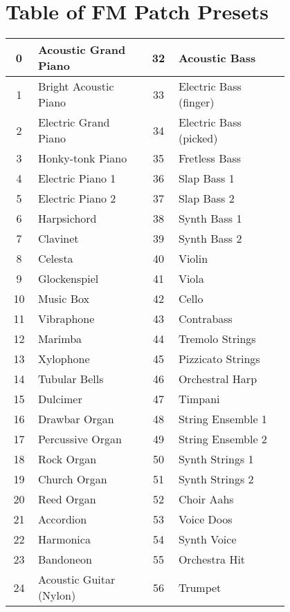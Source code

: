 \chapter{Table of FM Patch Presets}
\begin{tabular}{|c|p{0.4\linewidth}|c|p{0.4\linewidth}|}
	\hline
	0  &  Acoustic Grand Piano  & 32  &  Acoustic Bass  \\ \hline
	1  &  Bright Acoustic Piano  & 33  &  Electric Bass (finger)  \\ \hline
	2  &  Electric Grand Piano  & 34  &  Electric Bass (picked)  \\ \hline
	3  &  Honky-tonk Piano  & 35  &  Fretless Bass  \\ \hline
	4  &  Electric Piano 1  & 36  &  Slap Bass 1  \\ \hline
	5  &  Electric Piano 2  & 37  &  Slap Bass 2  \\ \hline
	6  &  Harpsichord  & 38  &  Synth Bass 1  \\ \hline
	7  &  Clavinet  & 39  &  Synth Bass 2  \\ \hline
	8  &  Celesta  & 40  &  Violin  \\ \hline
	9  &  Glockenspiel  & 41  &  Viola  \\ \hline
	10  &  Music Box  & 42  &  Cello  \\ \hline
	11  &  Vibraphone  & 43  &  Contrabass  \\ \hline
	12  &  Marimba  & 44  &  Tremolo Strings  \\ \hline
	13  &  Xylophone  & 45  &  Pizzicato Strings  \\ \hline
	14  &  Tubular Bells  & 46  &  Orchestral Harp  \\ \hline
	15  &  Dulcimer  & 47  &  Timpani  \\ \hline
	16  &  Drawbar Organ  & 48  &  String Ensemble 1  \\ \hline
	17  &  Percussive Organ  & 49  &  String Ensemble 2  \\ \hline
	18  &  Rock Organ  & 50  &  Synth Strings 1  \\ \hline
	19  &  Church Organ  & 51  &  Synth Strings 2  \\ \hline
	20  &  Reed Organ  & 52  &  Choir Aahs  \\ \hline
	21  &  Accordion  & 53  &  Voice Doos  \\ \hline
	22  &  Harmonica  & 54  &  Synth Voice  \\ \hline
	23  &  Bandoneon  & 55  &  Orchestra Hit  \\ \hline
	24  &  Acoustic Guitar (Nylon)  & 56  &  Trumpet  \\ \hline

\end{tabular}
